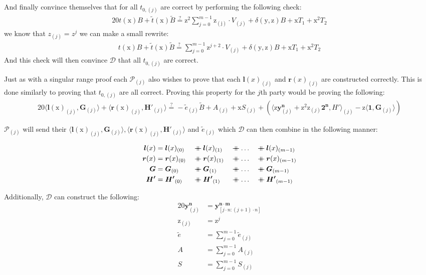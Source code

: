 \documentclass{article}
\newcommand{\eq}[1]{\begin{alignat*}{20}#1\end{alignat*}}
\newcommand{\eqn}[2]{\begin{equation}\label{#1}\begin{split}#2\end{split}\end{equation}}
\renewcommand{\vec}[1]{\boldsymbol{#1}}
\newcommand{\ran}[1]{\mathrm{#1}}
\newcommand{\vecran}[1]{\mathbf{#1}}
\renewcommand{\P}{\mathcal{P}}
\newcommand{\D}{\mathcal{D}}
\newcommand\concat{\mathbin{+\mkern-10mu+}} %
\newcommand{\dotp}[2]{\langle #1, #2 \rangle}
\newcommand{\blind}[1]{\widetilde{#1}}
\newcommand{\bt}{\blind{t}}
\newcommand{\bB}{\blind{B}}
\newcommand{\be}{\blind{e}}
\begin{document}
And finally convince themselves that for all $t_{0,(j)}$ are correct
by performing the following check:
\eq{
	t(\ran{x})B + \bt (\ran{x})\bB \stackrel{?}{=}
	\ran{z^2}\sum^{m-1}_{j = 0} \ran{z_{(j)}} \cdot V_{(j)} +
	\delta(\ran{y},\ran{z})B + \ran{x}T_1 + \ran{x^2}T_2
}
we know that $z_{(j)} = z^j$ we can make a small rewrite:
\eqn{aggregation-check-t0}{
	t(\ran{x})B + \bt (\ran{x})\bB \stackrel{?}{=}
	\sum^{m-1}_{j = 0} \ran{z}^{j+2} \cdot V_{(j)} +
	\delta(\ran{y},\ran{z})B + \ran{x}T_1 + \ran{x^2}T_2
}
And this check will then convince $\D$ that all $t_{0,(j)}$
are correct.

Just as with a singular range proof each $\P_{(j)}$ also wishes to prove
that each $\vec{l}(x)_{(j)}$ and $\vec{r}(x)_{(j)}$ are constructed
correctly. This is done similarly to proving that $t_{0,(j)}$
are all correct. Proving this property for the $j$th party would be
proving the following:
\eq{
	\dotp{\vec{l}(\ran{x})_{(j)}}{\vec{G}_{(j)}} + \dotp{\vec{r}(\ran{x})_{(j)}}{\vec{H'}_{(j)}} \stackrel{?}{=}
	-\be_{(j)}\bB + A_{(j)} + \ran{x}S_{(j)} +
	(\dotp{\ran{z}\vecran{y}^{\vec{n}}_{(j)} +
	\ran{z}^2\ran{z}_{(j)}\vec{2^n}}{H'}_{(j)} -
	\ran{z}\dotp{\vec{1}}{\vec{G}_{(j)}})
}

\newpage

$\P_{(j)}$ will send their $\dotp{\vec{l}(\ran{x})_{(j)}}{\vec{G}_{(j)}},
\dotp{\vec{r}(\ran{x})_{(j)}}{\vec{H'}_{(j)}}$ and $\be_{(j)}$
which $\D$ can then combine in the following manner:

\eq{
	\vec{l}(x) &= \vec{l}(x)_{(0)} &&\concat \vec{l}(x)_{(1)} &&\concat \dots &&\concat \vec{l}(x)_{(m-1)}\\
	\vec{r}(x) &= \vec{r}(x)_{(0)} &&\concat \vec{r}(x)_{(1)} &&\concat \dots &&\concat \vec{r}(x)_{(m-1)}\\
	\vec{G}    &= \vec{G}_{(0)}    &&\concat \vec{G}_{(1)}    &&\concat \dots &&\concat \vec{G}_{(m-1)}\\
	\vec{H'}   &= \vec{H'}_{(0)}   &&\concat \vec{H'}_{(1)}   &&\concat \dots &&\concat \vec{H'}_{(m-1)}
}

Additionally, $\D$ can construct the following:
\eq{
	\vecran{y}^{\vec{n}}_{(j)} &= \vecran{y}^{\vec{n \cdot m}}_{[j \cdot n : (j+1) \cdot n]}\\
	\ran{z}_{(j)}      &= \ran{z}^j\\
	\be      &= \sum^{m-1}_{j = 0} \be_{(j)}\\
	A                  &= \sum^{m-1}_{j = 0} A_{(j)}\\
	S                  &= \sum^{m-1}_{j = 0} S_{(j)}
}
\end{document}
